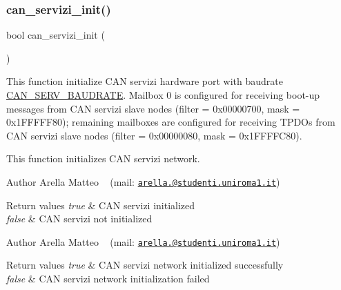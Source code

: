 \mbox{\label{group___c_a_n__servizi__group_ga2d29bd107e96ae1986e8874f004ffc84}} 
\subsubsection{\texorpdfstring{can\+\_\+servizi\+\_\+init()}{can\_servizi\_init()}}
{\footnotesize\ttfamily bool can\+\_\+servizi\+\_\+init (\begin{DoxyParamCaption}{ }\end{DoxyParamCaption})}



This function initialize C\+AN servizi hardware port with baudrate \mbox{\hyperlink{common_8h_a2a5e84dfc7fa972b75e7ddbc6cc52a45}{C\+A\+N\+\_\+\+S\+E\+R\+V\+\_\+\+B\+A\+U\+D\+R\+A\+TE}}. Mailbox 0 is configured for receiving boot-\/up messages from C\+AN servizi slave nodes (filter = 0x00000700, mask = 0x1\+F\+F\+F\+F\+F80); remaining mailboxes are configured for receiving T\+P\+D\+Os from C\+AN servizi slave nodes (filter = 0x00000080, mask = 0x1\+F\+F\+F\+F\+C80). 

This function initializes C\+AN servizi network.

\begin{DoxyAuthor}{Author}
Arella Matteo ~\newline
 (mail\+: \href{mailto:arella.1646983@studenti.uniroma1.it}{\tt arella.@studenti.\+uniroma1.\+it})
\end{DoxyAuthor}

\begin{DoxyRetVals}{Return values}
{\em true} & C\+AN servizi initialized \\
\hline
{\em false} & C\+AN servizi not initialized\\
\hline
\end{DoxyRetVals}
\begin{DoxyAuthor}{Author}
Arella Matteo ~\newline
 (mail\+: \href{mailto:arella.1646983@studenti.uniroma1.it}{\tt arella.@studenti.\+uniroma1.\+it})
\end{DoxyAuthor}

\begin{DoxyRetVals}{Return values}
{\em true} & C\+AN servizi network initialized successfully \\
\hline
{\em false} & C\+AN servizi network initialization failed \\
\hline
\end{DoxyRetVals}


